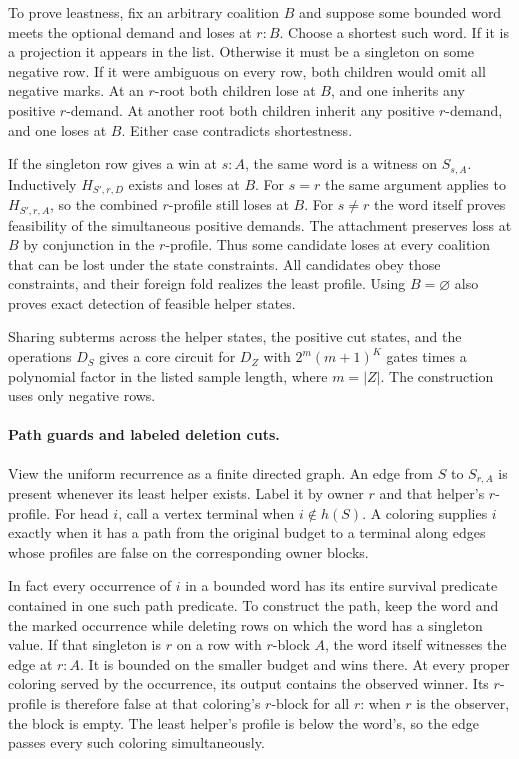 To prove leastness, fix an arbitrary coalition
$B$ and suppose some bounded word meets the
optional demand and loses at $r:B$. Choose a
shortest such word. If it is a projection it
appears in the list. Otherwise it must be a
singleton on some negative row. If it were
ambiguous on every row, both children would
omit all negative marks. At an $r$-root both
children lose at $B$, and one inherits any
positive $r$-demand. At another root both
children inherit any positive $r$-demand, and
one loses at $B$. Either case contradicts
shortestness.

If the singleton row gives a win at $s:A$,
the same word is a witness on $S_{s,A}$.
Inductively $H_{S',r,D}$ exists and loses at
$B$. For $s=r$ the same argument applies to
$H_{S',r,A}$, so the combined $r$-profile
still loses at $B$. For $s\ne r$ the word
itself proves feasibility of the simultaneous
positive demands. The attachment preserves
loss at $B$ by conjunction in the $r$-profile.
Thus some candidate loses at every coalition
that can be lost under the state constraints.
All candidates obey those constraints, and
their foreign fold realizes the least profile.
Using $B=\varnothing$ also proves exact
detection of feasible helper states.

Sharing subterms across the helper states,
the positive cut states, and the operations
$D_S$ gives a core circuit for $D_Z$ with
$2^m(m+1)^K$ gates times a polynomial factor
in the listed sample length, where $m=|Z|$.
The construction uses only negative rows.

\paragraph{Path guards and labeled deletion cuts.}
View the uniform recurrence as a finite directed graph.
An edge from $S$ to $S_{r,A}$ is present whenever its
least helper exists. Label it by owner $r$ and that
helper's $r$-profile. For head $i$, call a vertex
terminal when $i\notin h(S)$. A coloring supplies
$i$ exactly when it has a path from the original
budget to a terminal along edges whose profiles
are false on the corresponding owner blocks.

In fact every occurrence of $i$ in a bounded word has
its entire survival predicate contained in one such
path predicate. To construct the path, keep the
word and the marked occurrence while deleting rows
on which the word has a singleton value. If that
singleton is $r$ on a row with $r$-block $A$, the
word itself witnesses the edge at $r:A$. It is
bounded on the smaller budget and wins there.
At every proper coloring served by the occurrence,
its output contains the observed winner. Its
$r$-profile is therefore false at that coloring's
$r$-block for all $r$: when $r$ is the observer,
the block is empty. The least helper's profile is
below the word's, so the edge passes every such
coloring simultaneously.

